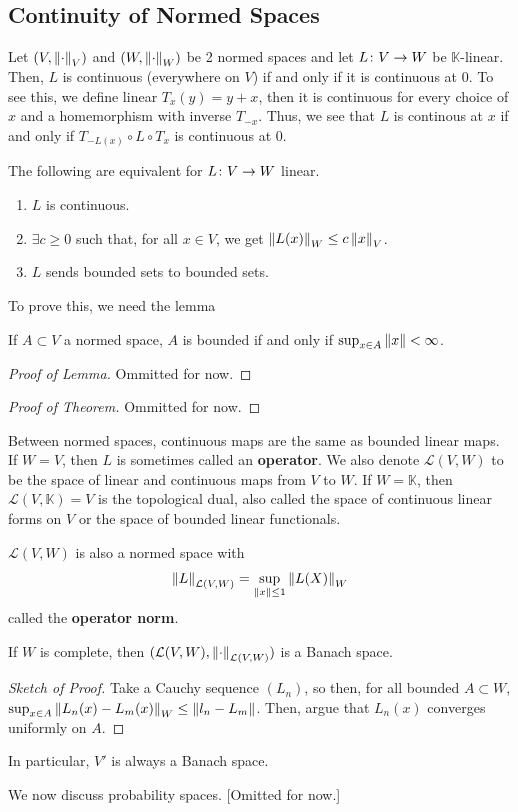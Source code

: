 \documentclass[11pt,leqno,oneside]{amsbook}
\numberwithin{thm}{section}
\newcommand{\cL}{\mathcal{L}}
\newcommand{\K}{\mathbb{K}} %
\renewcommand{\de}{\textbf} %
\begin{document}
  \subsection{Continuity of Normed Spaces}
  \begin{rmk}
    Let \((V,\norm_V)\) and \((W,\norm_W)\) be 2 normed spaces and let
    \(L \from V \to W\) be \(\K\)-linear. Then, \(L\) is continuous
    (everywhere on \(V\)) if and only if it is continuous at
    0. To see this, we define linear \(T_x(y) = y+x\), then it is
    continuous for every choice of \(x\) and a homemorphism with
    inverse \(T_{-x}\). Thus, we see that \(L\) is continous at \(x\)
    if and only if \(T_{-L(x)} \circ L \circ T_x\) is continuous at
    \(0\).
  \end{rmk}
  \begin{prop}
    The following are equivalent for \(L \from V \to W\) linear.
    \begin{enumerate}
    \item \(L\) is continuous.
    \item \(\exists c \geq 0\) such that, for all \(x \in V\), we get
      \(\norm[L(x)]_W \leq c \norm[x]_V\).
    \item \(L\) sends bounded sets to bounded sets.
    \end{enumerate}
  \end{prop}
  To prove this, we need the lemma
  \begin{lem}
    If \(A \subset V\) a normed space, \(A\) is bounded if and only if
    \(\sup_{x \in A} \norm[x] < \infty\).
  \end{lem}
  \begin{proof}[Proof of Lemma]
    Ommitted for now.
  \end{proof}
  \begin{proof}[Proof of Theorem]
    Ommitted for now.
  \end{proof}
  Between normed spaces, continuous maps are the same as bounded
  linear maps. If \(W = V\), then \(L\) is sometimes called an
  \de{operator}. We also denote \(\cL(V,W)\) to be the space of linear
  and continuous maps from \(V\) to \(W\). If \(W = \K\), then
  \(\cL(V,\K)=V\) is the topological dual, also called the space of
  continuous linear forms on \(V\) or the space of bounded linear
  functionals.
  \begin{prop}
    \(\cL(V,W)\) is also a normed space with \[
      \norm[L]_{\cL(V,W)} = \sup_{\norm[x] \leq 1} \norm[L(X)]_W
    \]
    called the \de{operator norm}.
  \end{prop}
  \begin{thm}
    If \(W\) is complete, then \((\cL(V,W),\norm_{\cL(V,W)})\) is a
    Banach space.
  \end{thm}
  \begin{proof}[Sketch of Proof]
    Take a Cauchy sequence \((L_n)\), so then, for all bounded \(A
    \subset W\), \(\sup_{x \in A} \norm[L_n(x) - L_m(x)]_W \leq
    \norm[l_n - L_m]\). Then, argue that \(L_n(x)\) converges
    uniformly on \(A\).
  \end{proof}
  In particular, \(V'\) is always a Banach space.
  \begin{example}
    We now discuss probability spaces. [Omitted for now.]
  \end{example}
\end{document}
